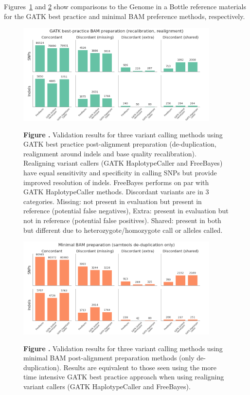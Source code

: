 \documentclass{frontiersSCNS}
\begin{document}
\FloatBarrier

Figures~\ref{fig:01} and \ref{fig:02} show comparisons to the Genome in a Bottle
reference materials for the GATK best practice and minimal BAM preference
methods, respectively.

\begin{figure}[tbp]
\begin{center}
\includegraphics[width=0.9\textwidth]{validation-gatkprep}
\end{center}
 \textbf{\label{fig:01} Figure .}{
   Validation results for three variant calling methods using GATK best practice
 post-alignment preparation (de-duplication, realignment around indels and base
 quality recalibration). Realigning variant callers (GATK HaplotypeCaller and
 FreeBayes) have equal sensitivity and specificity in calling SNPs but provide
 improved resolution of indels. FreeBayes performs on par with GATK
 HaplotypeCaller methods. Discordant variants are in 3 categories. Missing: not
 present in evaluation but present in reference (potential false negatives),
 Extra: present in evaluation but not in reference (potential false
 positives). Shared: present in both but different due to
 heterozygote/homozygote call or alleles called.}
\end{figure}

\begin{figure}[tbp]
\begin{center}
\includegraphics[width=0.9\textwidth]{validation-noprep}
\end{center}
 \textbf{\label{fig:02} Figure .}{
   Validation results for three variant calling methods using minimal BAM
   post-alignment preparation methods (only de-duplication). Results are
   equivalent to those seen using the more time intensive GATK best practice
   approach when using realigning variant callers (GATK HaplotypeCaller and FreeBayes).}
\end{figure}
\end{document}
